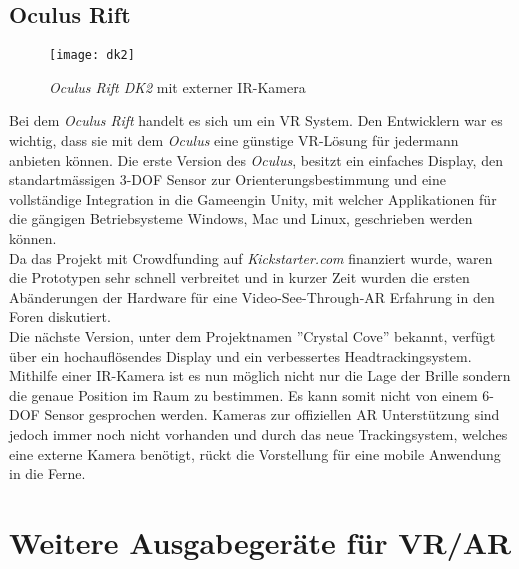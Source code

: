 \subsection*{Oculus Rift}
\begin{wrapfigure}{l}{0.5\textwidth}
	\vspace{-20pt}
	\begin{center}
		\texttt{[image: dk2]}
	\end{center}
	\vspace{-15pt}
	\captionsetup{width=0.42\textwidth}
	\caption{\textit{Oculus Rift DK2} mit externer IR-Kamera}\label{oculus}
	\vspace{-12pt}
\end{wrapfigure}
Bei dem \textit{Oculus Rift} handelt es sich um ein VR System. Den Entwicklern war es wichtig, dass sie mit dem \textit{Oculus} eine günstige VR-Lösung für jedermann anbieten können. Die erste Version des \textit{Oculus}, besitzt ein einfaches Display, den standartmässigen 3-DOF Sensor zur Orienterungsbestimmung und eine vollständige Integration in die Gameengin Unity, mit welcher Applikationen für die gängigen Betriebsysteme Windows, Mac und Linux, geschrieben werden können.\cite{website:oculus1}\\[6pt]
Da das Projekt mit Crowdfunding auf \textit{Kickstarter.com} finanziert wurde\cite{website:ocukick}, waren die Prototypen sehr schnell verbreitet und in kurzer Zeit wurden die ersten Abänderungen der Hardware für eine Video-See-Through-AR Erfahrung in den Foren diskutiert.\cite{website:arrift}\\[6pt]
Die nächste Version, unter dem Projektnamen ''Crystal Cove'' bekannt, verfügt über ein hochauflösendes Display und ein verbessertes Headtrackingsystem. Mithilfe einer IR-Kamera ist es nun möglich nicht nur die Lage der Brille sondern die genaue Position im Raum zu bestimmen. Es kann somit nicht von einem 6-DOF Sensor gesprochen werden. Kameras zur offiziellen AR Unterstützung sind jedoch immer noch nicht vorhanden und durch das neue Trackingsystem, welches eine externe Kamera benötigt, rückt die Vorstellung für eine mobile Anwendung in die Ferne.\cite{website:oculus2}
\newpage
\section{Weitere Ausgabegeräte für VR/AR}\label{s.otherdevices}
